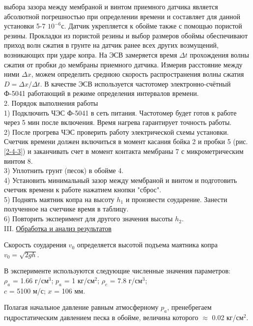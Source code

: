 \documentclass[specialist, subf, href, colorlinks=true, 14pt, final]{disser}
\theoremstyle{definition}
\newcommand{\npart}[2]{\noindent #1. \underline{#2}}
\begin{document}
выбора зазора между мембраной и винтом приемного датчика является абсолютной погрешностью при определении времени и составляет для данной установки 5-7 $10^{-6}$с. Датчик укрепляется к обойме также с помощью пористой резины. Прокладки из пористой резины и выбор размеров обоймы обеспечивают приход волн сжатия в грунте на датчик ранее всех других возмущений, возникающих при ударе копра. На ЭСВ замеряется время $\Delta t$ прохождения волны сжатия от пробки до мембраны приемного датчика. Измерив расстояние между ними $\Delta x$, можем определить среднюю скорость распространения волны сжатия $D = \Delta x/ \Delta t$. В качестве ЭСВ используется частотомер электронно-счётный Ф-5041 работающий в режиме определения интервалов времени.\\

2. Порядок выполнения работы\\
1) Подключить ЧЭС Ф-5041 в сеть питания. Частотомер будет готов к работе через 5 мин после включения. Время нагрева гарантирует точность работы.\\
2) После прогрева ЧЭС проверить работу электрической схемы установки. Счетчик времени должен включиться в момент касания бойка 2 и пробки 5 (рис. \ref{2-4-3}) и заканчивать счет в момент контакта мембраны 7 с микрометрическим винтом 8.\\
3) Уплотнить грунт (песок) в обойме 4.\\
4) Установить минимальный зазор между мембраной и винтом и подготовить счетчик времени к работе нажатием кнопки "сброс".\\
5) Поднять маятник копра на высоту $h_1$ и произвести соударение. Занести полученное на счетчике время в таблицу.\\
6) Повторить эксперимент для другого значения высоты $h_2$.\\

\npart{III}{Обработка и анализ результатов}

Скорость соударения $v_0$ определяется высотой подъема маятника копра $v_0 = \sqrt{2 g h}$.

В эксперименте используются следующие численные значения параметров:\\
$\rho_a$ = 1.66 г/см$^3$; $p_a$ = 1 кг/см$^2$; $\rho_c$ = 7.8 г/см$^3$;\\
$c$ = 5100 м/с; $x$ = 106 мм.

Полагая начальное давление равным атмосферному $p_a$, пренебрегаем гидростатическим давлением песка в обойме, величина которого $\approx$ 0.02 кг/см$^2$.
\end{document}
